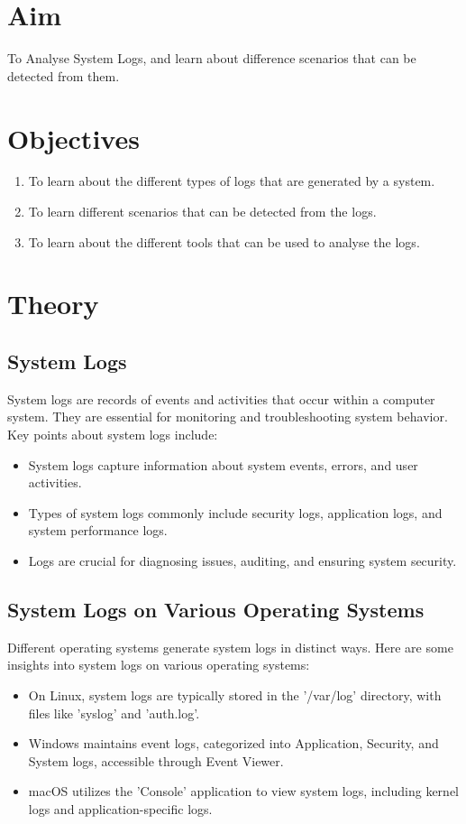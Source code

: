\documentclass[11pt]{article}
\begin{document}
\tableofcontents
\thispagestyle{empty}
\clearpage

\setcounter{page}{1}

\section{Aim}
To Analyse System Logs, and learn about difference scenarios that can be detected from them.

\section{Objectives}
\begin{enumerate}
    \item To learn about the different types of logs that are generated by a system.
    \item To learn different scenarios that can be detected from the logs.
    \item To learn about the different tools that can be used to analyse the logs.
\end{enumerate}
\section{Theory}

\subsection{System Logs}
System logs are records of events and activities that occur within a computer system. They are essential for monitoring and troubleshooting system behavior. Key points about system logs include:
\begin{itemize}
    \item System logs capture information about system events, errors, and user activities.
    \item Types of system logs commonly include security logs, application logs, and system performance logs.
    \item Logs are crucial for diagnosing issues, auditing, and ensuring system security.
\end{itemize}

\subsection{System Logs on Various Operating Systems}
Different operating systems generate system logs in distinct ways. Here are some insights into system logs on various operating systems:
\begin{itemize}
    \item On Linux, system logs are typically stored in the '/var/log' directory, with files like 'syslog' and 'auth.log'.
    \item Windows maintains event logs, categorized into Application, Security, and System logs, accessible through Event Viewer.
    \item macOS utilizes the 'Console' application to view system logs, including kernel logs and application-specific logs.
\end{itemize}
\end{document}
